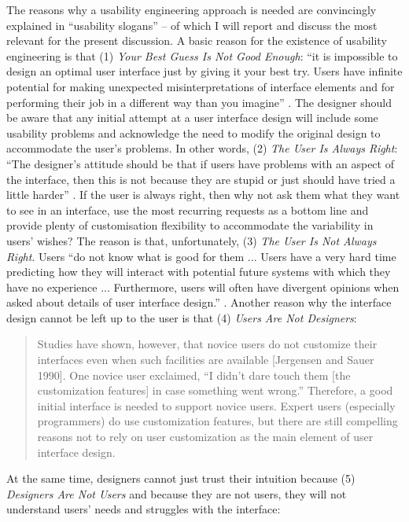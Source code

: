 The reasons why a usability engineering approach is needed are convincingly explained in \citet{nielsen1993usability} ``usability slogans'' -- of which I will report and discuss the most relevant for the present discussion. A basic reason for the existence of usability engineering is that (1) \textit{Your Best Guess Is Not Good Enough}: ``it is impossible to design an optimal user interface just by giving it your best try. Users have infinite potential for making unexpected misinterpretations of interface elements and for performing their job in a different way than you imagine'' \citep[10]{nielsen1993usability}. The designer should be aware that any initial attempt at a user interface design will include some usability problems and acknowledge the need to modify the original design to accommodate the user’s problems. In other words, (2) \textit{The User Is Always Right}: ``The designer's attitude should be that if users have problems with an aspect of the interface, then this is not because they are stupid or just should have tried a little harder'' \citep[11]{nielsen1993usability}. If the user is always right, then why not ask them what they want to see in an interface, use the most recurring requests as a bottom line and provide plenty of customisation flexibility to accommodate the variability in users’ wishes? The reason is that, unfortunately, (3) \textit{The User Is Not Always Right}. Users ``do not know what is good for them ... Users have a very hard time predicting how they will interact with potential future systems with which they have no experience ... Furthermore, users will often have divergent opinions when asked about details of user interface design.'' \citep[11--12]{nielsen1993usability}. Another reason why the interface design cannot be left up to the user is that (4) \textit{Users Are Not Designers}:

\begin{quote}
    Studies have shown, however, that novice users do not customize their interfaces even when such facilities are available [Jergensen and Sauer 1990]. One novice user exclaimed, ``I didn't dare touch them [the customization features] in case something went wrong.'' Therefore, a good initial interface is needed to support novice users. Expert users (especially programmers) do use customization features, but there are still compelling reasons not to rely on user customization as the main element of user interface design. \citep[12]{nielsen1993usability}
\end{quote}
At the same time, designers cannot just trust their intuition because (5) \textit{Designers Are Not Users} and because they are not users, they will not understand users’ needs and struggles with the interface:

